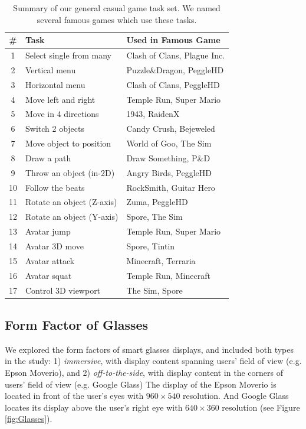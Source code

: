 \documentclass{sigchi}
\newcommand\tabhead[1]{\small\textbf{#1}}
\begin{document}
  \begin{table}
    \centering
    \begin{tabular}{|c|l|l|}
      \hline
      \tabhead{\#} &
      \multicolumn{1}{|p{0.4\columnwidth}|}{\centering\tabhead{Task}} &
      \multicolumn{1}{|p{0.45\columnwidth}|}{\centering\tabhead{Used in Famous Game}} \\
      \hline
      1 & Select single from many & Clash of Clans, Plague Inc.\\
      \hline
      2 & Vertical menu & Puzzle\&Dragon, PeggleHD \\
      \hline
      3 & Horizontal menu & Clash of Clans, PeggleHD\\
      \hline
      4 & Move left and right & Temple Run, Super Mario\\
      \hline
      5 & Move in 4 directions & 1943, RaidenX\\
      \hline
      6 & Switch 2 objects & Candy Crush, Bejeweled\\
      \hline
      7 & Move object to position & World of Goo, The Sim\\
      \hline
      8 & Draw a path & Draw Something, P\&D\\
      \hline
      9 & Throw an object (in-2D) & Angry Birds, PeggleHD\\
      \hline
      10 & Follow the beats & RockSmith, Guitar Hero\\
      \hline
      11 & Rotate an object (Z-axis) & Zuma, PeggleHD \\
      \hline
      12 & Rotate an object (Y-axis) & Spore, The Sim\\
      \hline
      13 & Avatar jump & Temple Run, Super Mario\\
      \hline
      14 & Avatar 3D move & Spore, Tintin\\
      \hline
      15 & Avatar attack & Minecraft, Terraria\\
      \hline
      16 & Avatar squat & Temple Run, Minecraft\\
      \hline
      17 & Control 3D viewport & The Sim, Spore\\
      \hline

    \end{tabular}
    \caption{Summary of our general casual game task set. We named several famous games which use these tasks.}
    \label{tab:table1}
  \end{table}



\subsection {Form Factor of Glasses}
We explored the form factors of smart glasses displays, and included both types in the study: 1) \emph{immersive}, with display content spanning users' field of view (e.g. Epson Moverio), and 2) \emph{off-to-the-side}, with display content in the corners of users' field of view (e.g. Google Glass)
The display of the Epson Moverio is located in front of the user's eyes with $960 \times 540$ resolution\cite{BT100}. And Google Glass locates its display above the user's right eye with $640 \times 360$ resolution\cite{GoogleGlass} (see Figure \ref{fig:Glasses}). 
\end{document}
